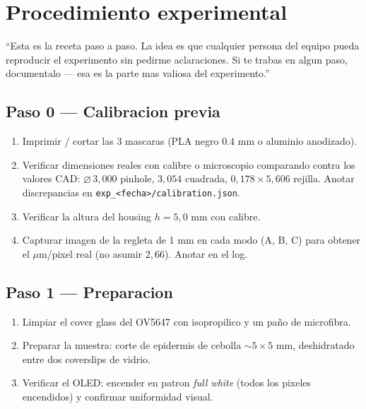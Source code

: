\documentclass[11pt,a4paper,oneside]{report}
\begin{document}
\chapter{Procedimiento experimental}

\begin{decir}
``Esta es la receta paso a paso. La idea es que cualquier persona del equipo pueda
reproducir el experimento sin pedirme aclaraciones. Si te trabas en algun paso,
documentalo --- esa es la parte mas valiosa del experimento.''
\end{decir}

\section{Paso 0 --- Calibracion previa}

\begin{enumerate}[leftmargin=2.2em]
  \item Imprimir / cortar las 3 mascaras (PLA negro 0.4 mm o aluminio anodizado).
  \item Verificar dimensiones reales con calibre o microscopio comparando contra
        los valores CAD: $\varnothing\,3{,}000$ pinhole, $3{,}054$ cuadrada,
        $0{,}178 \times 5{,}606$ rejilla. Anotar discrepancias en
        \texttt{exp\_<fecha>/calibration.json}.
  \item Verificar la altura del housing $h = 5{,}0$ mm con calibre.
  \item Capturar imagen de la regleta de 1 mm en cada modo (A, B, C) para obtener el
        $\mu$m/pixel real (no asumir $2{,}66$). Anotar en el log.
\end{enumerate}

\section{Paso 1 --- Preparacion}

\begin{enumerate}[leftmargin=2.2em]
  \item Limpiar el cover glass del OV5647 con isopropilico y un paño de microfibra.
  \item Preparar la muestra: corte de epidermis de cebolla $\sim 5\times 5$ mm,
        deshidratado entre dos coverslips de vidrio.
  \item Verificar el OLED: encender en patron \emph{full white} (todos los pixeles
        encendidos) y confirmar uniformidad visual.
\end{enumerate}
\end{document}

